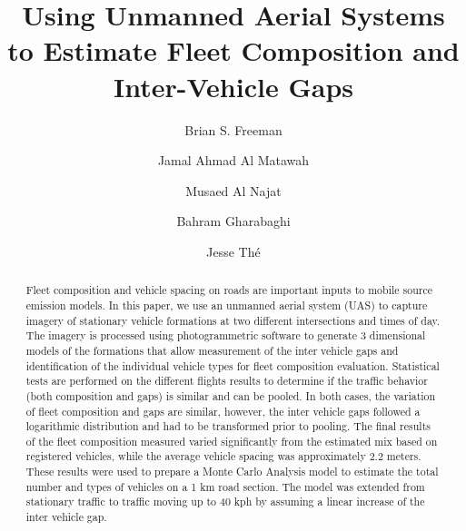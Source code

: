 \documentclass[preprint,12pt,a4paper,authoryear]{elsarticle}
\title{Using Unmanned Aerial Systems to Estimate Fleet Composition and Inter-Vehicle Gaps}
\begin{document}
\maketitle

\begin{linenumbers}
\begin{frontmatter}

\author[add1]{Brian S. Freeman }

\author[add2]{Jamal Ahmad Al Matawah}

\author[add2]{Musaed Al Najat}

\author[add1]{Bahram Gharabaghi}

\author[add1,add3]{Jesse Th\'e }


\address[add1]{School of Engineering, University of Guelph, Guelph, Ontario, N1G 2W1, Canada}
\address[add2]{Public Authority for Applied Education and Training, Shuwaikh, Kuwait}
\address[add3]{Lakes Environmental, 170 Columbia St W, Waterloo, Ontario, N2L 3L3 Canada}


\begin{abstract}
 Fleet composition and vehicle spacing on roads are important inputs to mobile source emission models. In this paper, we use an unmanned aerial system (UAS) to capture imagery of stationary vehicle formations at two different intersections and times of day. The imagery is processed using photogrammetric software to generate 3 dimensional models of the formations that allow measurement of the inter vehicle gaps and identification of the individual vehicle types for fleet composition evaluation. Statistical tests are performed on the different flights results to determine if the traffic behavior (both composition and gaps) is similar and can be pooled. In both cases, the variation of fleet composition and gaps are similar, however, the inter vehicle gaps followed a logarithmic distribution and had to be transformed prior to pooling. The final results of the fleet composition measured varied significantly from the estimated mix based on registered vehicles, while the average vehicle spacing was approximately 2.2 meters. These results were used to prepare a Monte Carlo Analysis model to estimate the total number and types of vehicles on a 1 km road section. The model was extended from stationary traffic to traffic moving up to 40 kph by assuming a linear increase of the inter vehicle gap.\\


\end{abstract}
\end{frontmatter}
\end{linenumbers}
\end{document}
